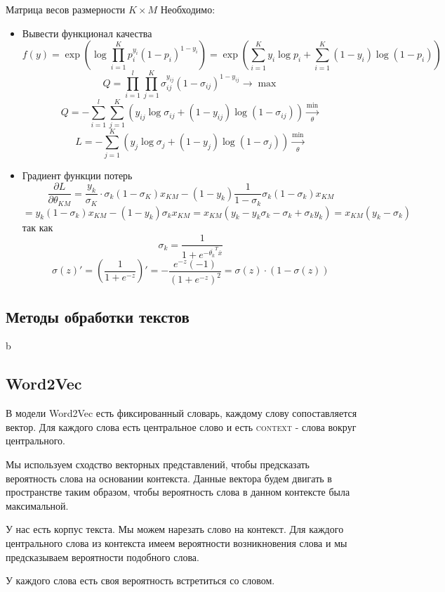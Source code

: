 \documentclass[%
10pt, %
final, %
oneside, %
onecolumn, %
centertags]{article} %
\theoremstyle{plain}
\theoremstyle{definition}
\theoremstyle{remark}
\begin{document}
Матрица весов размерности $K \times M$
Необходимо:
\begin{itemize}
	\item Вывести функционал качества
	$$f(y) = \exp \left(\log \prod\limits_{i=1}^K p_i^{y_i}(1-p_i)^{1-y_i}\right) = \exp\left(\sum\limits_{i=1}^K y_i \log p_i + \sum\limits_{i=1}^K (1-y_i) \log (1-p_i)\right)$$
	$$Q = \prod\limits_{i=1}^l \prod\limits_{j=1}^K \sigma_{ij}^{y_{ij}}(1-\sigma_{ij})^{1-y_{ij}} \to \max$$
	$$Q = -\sum\limits_{i=1}^l \sum\limits_{j=1}^K \left(y_{ij}\log \sigma_{ij}+(1-y_{ij})\log (1-\sigma_{ij})\right)\xrightarrow[\theta]{\min}$$
	$$L = - \sum\limits_{j=1}^K \left(y_{j}\log \sigma_{j}+(1-y_{j})\log (1-\sigma_{j})\right)\xrightarrow[\theta]{\min}$$
	\item Градиент функции потерь
	$$\frac{\partial L}{\partial \theta_{KM}} = \frac{y_k}{\sigma_{K}} \cdot \sigma_k(1-\sigma_K)x_{KM} - (1-y_k)\frac{1}{1-\sigma_k}\sigma_k (1-\sigma_k) x_{KM} $$
	$$ = y_k(1-\sigma_k)x_{KM} - (1-y_k)\sigma_k x_{KM} = x_{KM}(y_k-y_k\sigma_k-\sigma_k+\sigma_k y_k) = x_{KM}(y_k-\sigma_k)$$
	так как
	$$\sigma_k = \frac{1}{1+e^{-\overline{\theta_k}^T \overline{x}}}$$
	$$\sigma(z)' = \left(\frac{1}{1+e^{-z}}\right)' = - \frac{e^{-z}(-1)}{(1+e^{-z})^2} = \sigma(z) \cdot (1-\sigma(z))$$

\end{itemize}


\subsection{Методы обработки текстов}
\newpage
b
\newpage
\subsection{Word2Vec}

В модели Word2Vec есть фиксированный словарь, каждому слову сопоставляется вектор. Для каждого слова есть центральное слово и есть \textsc{context} - слова вокруг центрального.

Мы используем сходство векторных представлений, чтобы предсказать вероятность слова на основании контекста. Данные вектора будем двигать в пространстве таким образом, чтобы вероятность слова в данном контексте была максимальной.

У нас есть корпус текста. Мы можем нарезать слово на контекст. Для каждого центрального слова из контекста имеем вероятности возникновения слова и мы предсказываем вероятности подобного слова.

У каждого слова есть своя вероятность встретиться со словом.
\end{document}
